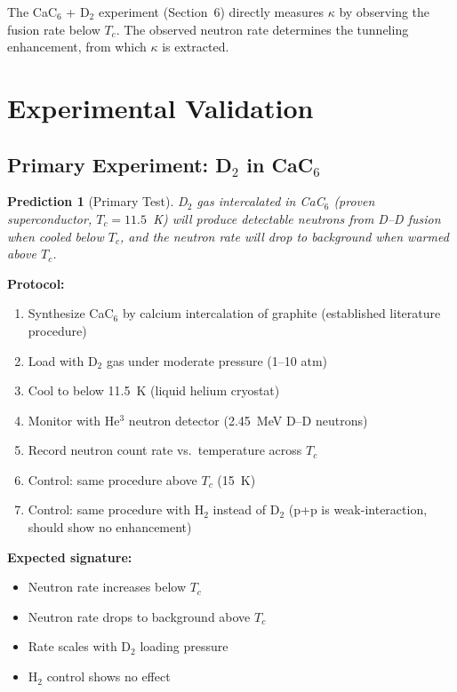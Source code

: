 \documentclass[11pt, a4paper]{article}
\newtheorem{prediction}{Prediction}[section]
\begin{document}
The CaC$_6$ + D$_2$ experiment (Section~6) directly measures
$\kappa$ by observing the fusion rate below $T_c$. The observed
neutron rate determines the tunneling enhancement, from which
$\kappa$ is extracted.

\section{Experimental Validation}

\subsection{Primary Experiment: D$_2$ in CaC$_6$}

\begin{prediction}[Primary Test]
D$_2$ gas intercalated in CaC$_6$ (proven superconductor,
$T_c = 11.5$~K) will produce detectable neutrons from D--D
fusion when cooled below $T_c$, and the neutron rate will drop
to background when warmed above $T_c$.
\end{prediction}

\textbf{Protocol:}
\begin{enumerate}[nosep]
  \item Synthesize CaC$_6$ by calcium intercalation of graphite
        (established literature procedure)
  \item Load with D$_2$ gas under moderate pressure (1--10 atm)
  \item Cool to below 11.5~K (liquid helium cryostat)
  \item Monitor with He$^3$ neutron detector (2.45~MeV D--D
        neutrons)
  \item Record neutron count rate vs.\ temperature across $T_c$
  \item Control: same procedure above $T_c$ (15~K)
  \item Control: same procedure with H$_2$ instead of D$_2$
        (p+p is weak-interaction, should show no enhancement)
\end{enumerate}

\textbf{Expected signature:}
\begin{itemize}[nosep]
  \item Neutron rate increases below $T_c$
  \item Neutron rate drops to background above $T_c$
  \item Rate scales with D$_2$ loading pressure
  \item H$_2$ control shows no effect
\end{itemize}
\end{document}
